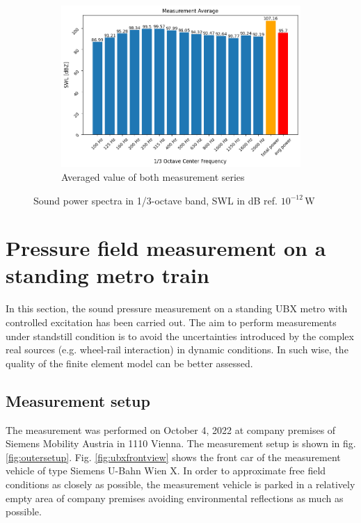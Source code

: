 \begin{figure}[H]\ContinuedFloat
     \centering
     \begin{subfigure}[b]{0.9\textwidth}
         \centering
         \includegraphics[width=\linewidth]{fig/SWL_average.png}
         \caption{Averaged value of both measurement series}
         \label{fig:average_SWL}
     \end{subfigure}
     
        \caption{Sound power spectra in 1/3-octave band, SWL in dB ref. $10^{-12}\, \text{W}$}
        \label{fig:SWL}
\end{figure}


\section{Pressure field measurement on a standing metro train}
\label{sec:pressure_field_measurement}

In this section, the sound pressure measurement on a standing UBX metro with controlled excitation has been carried out. The aim to perform measurements under standstill condition is to avoid the uncertainties introduced by the complex real sources (e.g. wheel-rail interaction) in dynamic conditions. In such wise, the quality of the finite element model can be better assessed.

\subsection*{Measurement setup}

The measurement was performed on October 4, 2022 at company premises of Siemens Mobility Austria in 1110 Vienna. The measurement setup is shown in fig. \ref{fig:outersetup}. Fig. \ref{fig:ubxfrontview} shows the front car of the measurement vehicle of type Siemens U-Bahn Wien X. In order to approximate free field conditions as closely as possible, the measurement vehicle is parked in a relatively empty area of company premises avoiding environmental reflections as much as possible.

